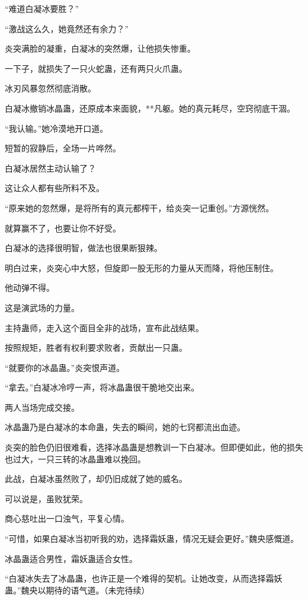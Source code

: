 \begin{this_body}
“难道白凝冰要胜？”

“激战这么久，她竟然还有余力？”

炎突满脸的凝重，白凝冰的突然爆，让他损失惨重。

一下子，就损失了一只火蛇蛊，还有两只火爪蛊。

冰刃风暴忽然彻底消散。

白凝冰撤销冰晶蛊，还原成本来面貌，**凡躯。她的真元耗尽，空窍彻底干涸。

“我认输。”她冷漠地开口道。

短暂的寂静后，全场一片哗然。

白凝冰居然主动认输了？

这让众人都有些所料不及。

“原来她的忽然爆，是将所有的真元都榨干，给炎突一记重创。”方源恍然。

就算赢不了，也要让你不好受。

白凝冰的选择很明智，做法也很果断狠辣。

明白过来，炎突心中大怒，但旋即一股无形的力量从天而降，将他压制住。

他动弹不得。

这是演武场的力量。

主持蛊师，走入这个面目全非的战场，宣布此战结果。

按照规矩，胜者有权利要求败者，贡献出一只蛊。

“就要你的冰晶蛊。”炎突恨声道。

“拿去。”白凝冰冷哼一声，将冰晶蛊很干脆地交出来。

两人当场完成交接。

冰晶蛊乃是白凝冰的本命蛊，失去的瞬间，她的七窍都流出血迹。

炎突的脸色仍旧很难看，选择冰晶蛊是想教训一下白凝冰。但即便如此，他的损失也过大，一只三转的冰晶蛊难以挽回。

此战，白凝冰虽然败了，却仍旧成就了她的威名。

可以说是，虽败犹荣。

商心慈吐出一口浊气，平复心情。

“可惜，如果白凝冰当初听我的劝，选择霜妖蛊，情况无疑会更好。”魏央感慨道。

冰晶蛊适合男性，霜妖蛊适合女性。

“白凝冰失去了冰晶蛊，也许正是一个难得的契机。让她改变，从而选择霜妖蛊。”魏央以期待的语气道。（未完待续）

\end{this_body}

